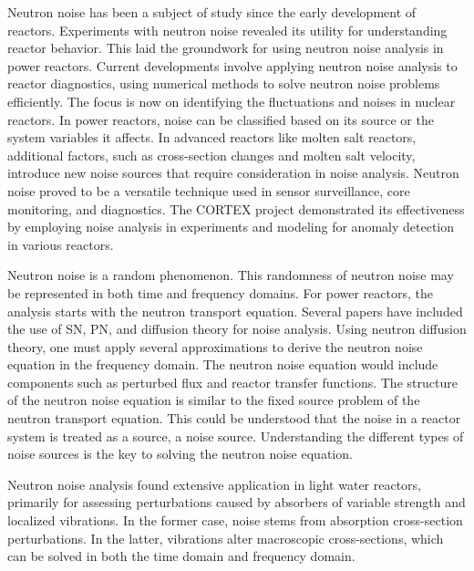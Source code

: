 Neutron noise has been a subject of study since the early development of reactors. Experiments with neutron noise revealed its utility for understanding reactor behavior. This laid the groundwork for using neutron noise analysis in power reactors. Current developments involve applying neutron noise analysis to reactor diagnostics, using numerical methods to solve neutron noise problems efficiently. The focus is now on identifying the fluctuations and noises in nuclear reactors. In power reactors, noise can be classified based on its source or the system variables it affects. In advanced reactors like molten salt reactors, additional factors, such as cross-section changes and molten salt velocity, introduce new noise sources that require consideration in noise analysis. Neutron noise proved to be a versatile technique used in sensor surveillance, core monitoring, and diagnostics. The CORTEX project demonstrated its effectiveness by employing noise analysis in experiments and modeling for anomaly detection in various reactors.

Neutron noise is a random phenomenon. This randomness of neutron noise may be represented in both time and frequency domains. For power reactors, the analysis starts with the neutron transport equation. Several papers have included the use of SN, PN, and diffusion theory for noise analysis. Using neutron diffusion theory, one must apply several approximations to derive the neutron noise equation in the frequency domain. The neutron noise equation would include components such as perturbed flux and reactor transfer functions. The structure of the neutron noise equation is similar to the fixed source problem of the neutron transport equation. This could be understood that the noise in a reactor system is treated as a source, a noise source. Understanding the different types of noise sources is the key to solving the neutron noise equation.

Neutron noise analysis found extensive application in light water reactors, primarily for assessing perturbations caused by absorbers of variable strength and localized vibrations. In the former case, noise stems from absorption cross-section perturbations. In the latter, vibrations alter macroscopic cross-sections, which can be solved in both the time domain and frequency domain.
